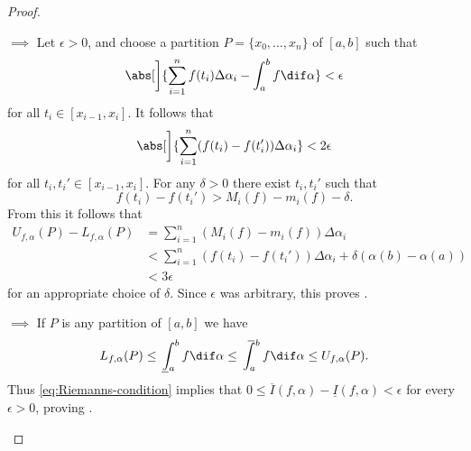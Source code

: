 \documentclass[article, a4paper, 11pt, oneside]{memoir}
\numberwithin{equation}{chapter}
\begin{document}
\begin{proof}
\begin{proofsec}
    \item[\subcref{enum:integrability} $\implies$ \subcref{enum:Riemanns-condition}]
    Let $\epsilon > 0$, and choose a partition $P = \{x_0, \ldots, x_n\}$ of $[a,b]$ such that
    \begin{equation*}
        \abs[\bigg]{ \sum_{i=1}^n f(t_i) \Delta\alpha_i - \int_a^b f \dif\alpha }
        < \epsilon
    \end{equation*}
    for all $t_i \in [x_{i-1},x_i]$. It follows that
    \begin{equation*}
        \abs[\bigg]{ \sum_{i=1}^n (f(t_i) - f(t_i')) \Delta\alpha_i }
        < 2 \epsilon
    \end{equation*}
    for all $t_i, t_i' \in [x_{i-1},x_i]$. For any $\delta > 0$ there exist $t_i, t_i'$ such that
    \begin{equation*}
        f(t_i) - f(t_i')
        > M_i(f) - m_i(f) - \delta.
    \end{equation*}
    From this it follows that
    \begin{align*}
        U_{f,\alpha}(P) - L_{f,\alpha}(P)
        &= \sum_{i=1}^n (M_i(f) - m_i(f)) \Delta\alpha_i \\
        &< \sum_{i=1}^n (f(t_i) - f(t_i')) \Delta\alpha_i + \delta (\alpha(b) - \alpha(a)) \\
        &< 3\epsilon
    \end{align*}
    for an appropriate choice of $\delta$. Since $\epsilon$ was arbitrary, this proves .
    
    \item[\subcref{enum:Riemanns-condition} $\implies$ \subcref{enum:upper-lower-integrals-equal}]
    If $P$ is any partition of $[a,b]$ we have
    \begin{equation*}
        L_{f,\alpha}(P)
        \leq \lowint_a^b f \dif\alpha
        \leq \upint_a^b f \dif\alpha
        \leq U_{f,\alpha}(P).
    \end{equation*}
    Thus \cref{eq:Riemanns-condition} implies that $0 \leq \overline{I}(f,\alpha) - \underline{I}(f,\alpha) < \epsilon$ for every $\epsilon > 0$, proving .
    

\end{proofsec}
\end{proof}
\end{document}
